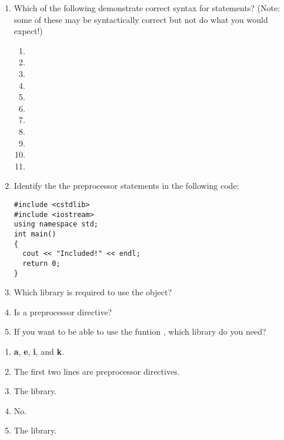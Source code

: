 \begin{enumerate}
	\item Which of the following demonstrate correct syntax for  statements? (Note: some of these may be syntactically correct but not do what you would expect!)
	
	\begin{enumerate}
		\item {}
		\item {}
		\item {}
		\item {}
		\item {}
		\item {}
		\item {}
		\item {}
		\item {}
		\item {}
		\item {}
	\end{enumerate}
 
	\item Identify the the preprocessor statements in the following code: \nopagebreak[4]

\noindent\begin{minipage}{\linewidth}\begin{lstlisting}
#include <cstdlib>
#include <iostream>
using namespace std;
int main()
{
  cout << "Included!" << endl;
  return 0;
}
\end{lstlisting}\end{minipage}

  \item Which library is required to use the  object?
 
	\item Is  a preprocessor directive?
 
	\item If you want to be able to use the funtion , which library do you need?

\end{enumerate}


\begin{enumerate}
	\item \textbf{a}, \textbf{e}, \textbf{i}, and \textbf{k}.
	\item The first two lines are preprocessor directives.
	\item The  library.
	\item No.
	\item The  library.
\end{enumerate}



